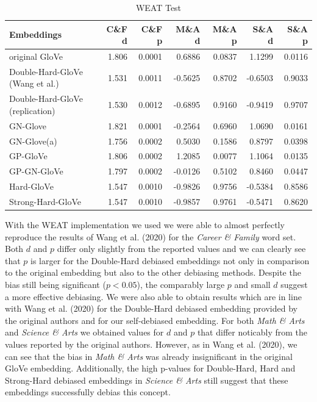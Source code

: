 \documentclass[
  english,
  man,floatsintext]{apa6}
\begin{document}
\begin{table}

\caption{\label{tab:unnamed-chunk-1}WEAT Test}
\centering
\begin{tabular}[t]{l|r|r|r|r|r|r}
\hline
Embeddings & C\&F d & C\&F p & M\&A d & M\&A p & S\&A d & S\&A p\\
\hline
original GloVe & 1.806 & 0.0001 & 0.6886 & 0.0837 & 1.1299 & 0.0116\\
\hline
Double-Hard-GloVe (Wang et al.) & 1.531 & 0.0011 & -0.5625 & 0.8702 & -0.6503 & 0.9033\\
\hline
Double-Hard-GloVe (replication) & 1.530 & 0.0012 & -0.6895 & 0.9160 & -0.9419 & 0.9707\\
\hline
GN-Glove & 1.821 & 0.0001 & -0.2564 & 0.6960 & 1.0690 & 0.0161\\
\hline
GN-Glove(a) & 1.756 & 0.0002 & 0.5030 & 0.1586 & 0.8797 & 0.0398\\
\hline
GP-GloVe & 1.806 & 0.0002 & 1.2085 & 0.0077 & 1.1064 & 0.0135\\
\hline
GP-GN-GloVe & 1.797 & 0.0002 & -0.0126 & 0.5102 & 0.8460 & 0.0447\\
\hline
Hard-GloVe & 1.547 & 0.0010 & -0.9826 & 0.9756 & -0.5384 & 0.8586\\
\hline
Strong-Hard-GloVe & 1.547 & 0.0010 & -0.9857 & 0.9761 & -0.5471 & 0.8620\\
\hline
\end{tabular}
\end{table}

With the WEAT implementation we used we were able to almost perfectly reproduce the results of Wang et al. (2020) for the \emph{Career \& Family} word set. Both \(d\) and \(p\) differ only slightly from the reported values and we can clearly see that \(p\) is larger for the Double-Hard debiased embeddings not only in comparison to the original embedding but also to the other debiasing methods. Despite the bias still being significant (\(p<0.05\)), the comparably large \(p\) and small \(d\) suggest a more effective debiasing. We were also able to obtain results which are in line with Wang et al. (2020) for the Double-Hard debiased embedding provided by the original authors and for our self-debiased embedding.
For both \emph{Math \& Arts} and \emph{Science \& Arts} we obtained values for \(d\) and \(p\) that differ noticably from the values reported by the original authors. However, as in Wang et al. (2020), we can see that the bias in \emph{Math \& Arts} was already insignificant in the original GloVe embedding. Additionally, the high p-values for Double-Hard, Hard and Strong-Hard debiased embeddings in \emph{Science \& Arts} still suggest that these embeddings successfully debias this concept.
\end{document}
